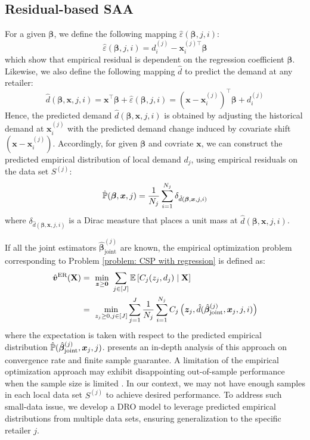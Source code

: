 \documentclass[mnsc, nonblindrev]{informswp}
\newcommand{\1}[1]{\mathds{1}{\left(#1\right)}}
\begin{document}
\subsection{Residual-based SAA}
For a given ${\bm \beta}$, we define the following mapping $\hat{\varepsilon}({\bm \beta}, j, i)$:
\[
\hat{\varepsilon}({\bm \beta}, j, i)  = {d}_i^{(j)} - {\bm x}_i^{(j) \top} {\bm \beta}
\]
which show that empirical residual is dependent on the regression coefficient ${\bm \beta}$. Likewise, we also define the following mapping $\hat{d}$ to predict the demand at any retailer:
\[
\hat{d}({\bm \beta}, {\bm x}, j, i) = \bm x ^\top \bm \beta + \hat{\varepsilon}({\bm \beta}, j, i) = (\bm x - {\bm x}_i^{(j)})^ \top {\bm \beta} + {d}_i^{(j)}
\]
Hence, the predicted demand $\hat{d}({\bm \beta}, {\bm x}, j, i)$ is obtained by adjusting the historical demand at ${\bm x}_i^{(j)}$ with the predicted demand change induced by covariate shift $(\bm x - {\bm x}_i^{(j)})$. Accordingly, for given ${\bm \beta}$ and covriate ${\bm x}$, we can construct the predicted empirical distribution of local demand $d_j$, using empirical residuals on the data set $S^{(j)}$:
\[
\hat{\mathbb{P}}(\bm \beta,\bm x, j) = \frac{1}{N_j} \sum_{i=1}^{N_j} \delta_{\hat{d}({\bm \beta}, {\bm x}, j, i)}
\]
where $\delta_{\hat{d}({\bm \beta}, {\bm x}, j, i)}$ is a Dirac measture that places a unit mass at ${\hat{d}({\bm \beta}, {\bm x}, j, i)}$.

If all the joint estimators $\hat{\bm \beta}_{\text{joint}}^{(j)}$ are known, the empirical optimization problem corresponding to Problem \eqref{problem: CSP with regression} is defined as: 
\begin{equation}
\begin{aligned}
\hat{\bm v}^{\text{ER}}({\mb X}) & = \ 
\min_{\bm z \geq \bm 0} \ \sum_{j \in [J]} \mathbb{E} \left[  C_j (z_j,  d_j)  \mid \mb X \right]
 \\
& = \ 
\min_{ z_j \geq 0, j\in[J]}
 \sum_{j=1}^J 
 \frac{1}{N_j} \sum_{i = 1}^{N_j} 
C_j \left( \bm z_j, \hat{d}(\hat{\bm \beta}_{\text{joint}}^{(j)}, \bm x_j, j, i)  \right) 
\label{problem: Empirical Optimization Problem}
\end{aligned}
\end{equation}
where the expectation is taken with respect to the predicted empirical distribution $\hat{\mathbb{P}}(\hat{\bm \beta}_{\text{joint}}^{(j)},\bm x_j, j)$. \citet{kannan2025data} presents an in-depth analysis of this approach on convergence rate and finite sample guarantee. A limitation of the empirical optimization approach may exhibit disappointing out-of-sample performance when the sample size is limited \citep{Kannan_Bayraksan_Luedtke_2020residuals}. In our context, we may not have enough samples in each local data set $S^{(j)}$ to achieve desired performance. To address such small-data issue, we develop a DRO model to leverage predicted empirical distributions from multiple data sets, ensuring generalization to the specific retailer $j$.
\end{document}
